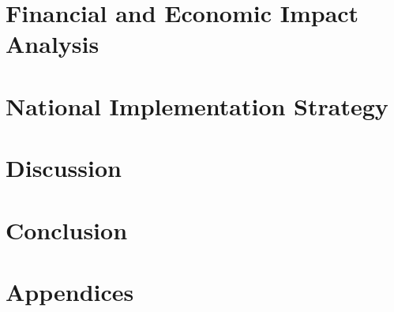 \documentclass[a4paper,12pt,twoside]{article}
\begin{document}
\section{Financial and Economic Impact Analysis}
\label{sec:financial}

\newpage

\section{National Implementation Strategy}
\label{sec:implementation}

\newpage

\section{Discussion}
\label{sec:discussion}

\newpage

\section{Conclusion}
\label{sec:conclusion}

\newpage

\pagestyle{contents}


\newpage

\section*{Appendices}

\end{document}
